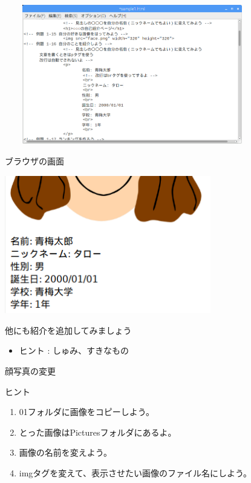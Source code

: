 \documentclass[a4paper,12pt]{jarticle}
\begin{document}
\includegraphics[width=11.151cm,height=6.066cm]{textbook-img177.png}



\bigskip

\bigskip



ブラウザの画面

\includegraphics[width=9cm,height=6cm]{textbook-img173.png}



\clearpage
{}\theQuestion\label{Q:hasAnswer04-4}

他にも紹介を追加してみましょう

\begin{itemize}
  \item ヒント : しゅみ、すきなもの
\end{itemize}
\theQuestion\label{Q:hasAnswer04-5}

顔写真の変更

ヒント

\begin{enumerate}
  \item
        01フォルダに画像をコピーしよう。
  \item とった画像はPicturesフォルダにあるよ。
  \item 画像の名前を変えよう。
  \item
        imgタグを変えて、表示させたい画像のファイル名にしよう。
\end{enumerate}
\end{document}
